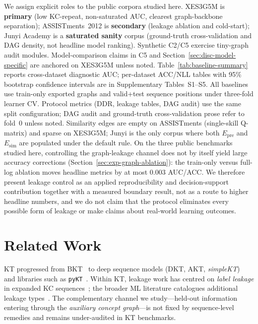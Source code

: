\documentclass[pdflatex,sn-mathphys-num]{sn-jnl}
\newcommand{\Epre}{\ensuremath{E_{\text{pre}}}}
\newcommand{\Esim}{\ensuremath{E_{\text{sim}}}}
\newcommand{\DDR}{\textsc{DDR}}
\begin{document}
We assign explicit roles to the public corpora studied here.
XES3G5M is \textbf{primary} (low KC-repeat, non-saturated AUC, clearest
graph-backbone separation); ASSISTments~2012 is \textbf{secondary}
(leakage ablation and cold-start); Junyi Academy is a \textbf{saturated
sanity} corpus (ground-truth cross-validation and DAG density, not headline
model ranking). Synthetic C2/C5 exercise tiny-graph audit modules.
Model-comparison claims in C5 and Section~\ref{sec:disc-model-specific}
are anchored on XES3G5M unless noted. Table~\ref{tab:baseline-summary}
reports cross-dataset diagnostic AUC; per-dataset ACC/NLL tables with 95\%
bootstrap confidence intervals are in Supplementary Tables~S1--S5. All
baselines use train-only exported graphs and valid+test sequence positions
under three-fold learner CV. Protocol metrics (\DDR{}, leakage tables, DAG
audit) use the same split configuration; DAG audit and ground-truth
cross-validation prose refer to fold~0 unless noted. Similarity edges are
empty on ASSISTments (single-skill Q-matrix) and sparse on XES3G5M; Junyi
is the only corpus where both $\Epre$ and $\Esim$ are populated under the
default rule. On the three public benchmarks studied here,
controlling the graph-leakage channel does not by itself yield large
accuracy corrections (Section~\ref{sec:exp-graph-ablation}): the train-only
versus full-log ablation moves headline metrics by at most $0.003$ AUC/ACC.
We therefore present leakage control as an applied reproducibility and
decision-support contribution together with a measured boundary result, not
as a route to higher headline numbers, and we do not claim that the
protocol eliminates every possible form of leakage or make claims about
real-world learning outcomes.
\section{Related Work}
\label{sec:related}
KT progressed from BKT~\cite{corbett1995bkt} to deep sequence models
(DKT, AKT, \textit{simpleKT})~\cite{piech2015dkt,ghosh2020akt,liu2023simplekt}
and libraries such as \texttt{pyKT}~\cite{liu2022pykt,abdelrahman2023kt_survey}.
Within KT, leakage work has centred on \emph{label leakage} in expanded KC
sequences~\cite{liu2022pykt,badran2024labelleakage}; the broader ML literature
catalogues additional leakage types~\cite{kaufman2012leakage,kapoor2023leakage}.
The complementary channel we study---held-out information entering through the
\emph{auxiliary concept graph}---is not fixed by sequence-level remedies and
remains under-audited in KT benchmarks.
\end{document}
